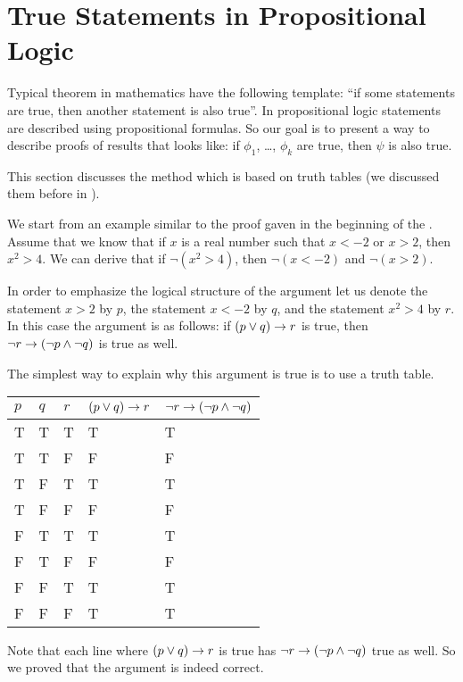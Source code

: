 \chapter{True Statements in Propositional Logic}
\label{chapter:propositional-truth}


Typical theorem in mathematics have the following template:
``if some statements are true, then another statement is also true''.
In propositional logic statements are described using propositional formulas.
So our goal is to present a way to describe proofs of results that looks like:
if $\phi_1$, \dots, $\phi_k$ are true, then $\psi$ is also true.

This section discusses the method which is based on truth tables (we discussed
them before in ).

We start from an example similar to
the proof gaven in the beginning of the . Assume that we
know that if $x$ is a real number such that $x < -2$ or $x > 2$, then $x^2 > 4$.
We can derive that if $\lnot (x^2 > 4)$, then $\lnot (x < -2)$ and 
$\lnot (x > 2)$.

In order to emphasize the logical structure of the argument let us denote the
statement $x > 2$ by $p$, the statement $x < -2$ by $q$, and the statement 
$x^2 > 4$ by $r$. In this case the argument is as follows:
if $(p \lor q) \rightarrow r$ is true, then
$\lnot r \rightarrow (\lnot p \land \lnot q)$ is true as well.

The simplest way to explain why this argument is true is to use
a truth table.
\begin{center}
  \begin{tabular}{l l l l l}
    \toprule
    $p$ & $q$ & $r$ & $(p \lor q) \rightarrow r$ &
    $\lnot r \rightarrow (\lnot p \land \lnot q)$ \\
    \midrule
    T & T & T & T & T \\
    T & T & F & F & F \\
    T & F & T & T & T \\
    T & F & F & F & F \\
    F & T & T & T & T \\
    F & T & F & F & F \\
    F & F & T & T & T \\
    F & F & F & T & T \\
    \bottomrule
  \end{tabular}
\end{center}
Note that each line where $(p \lor q) \rightarrow r$ is true has
$\lnot r \rightarrow (\lnot p \land \lnot q)$ true as well. So we proved that
the argument is indeed correct.

